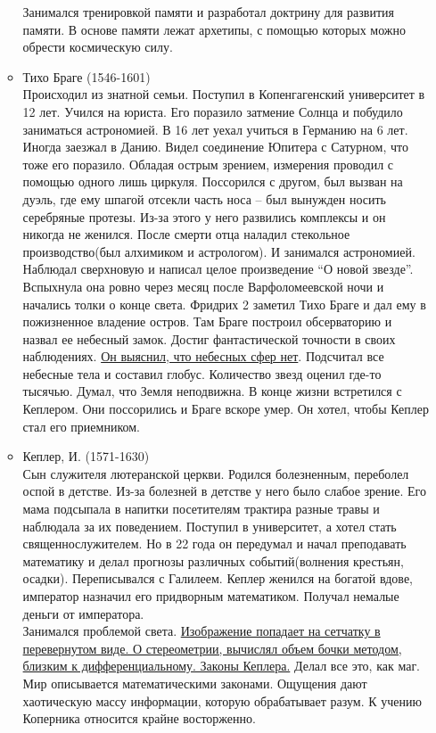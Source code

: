 \documentclass[a4paper,12pt]{report} %
\begin{document}
\begin{itemize}
\begin{itemize}
Занимался тренировкой памяти и разработал доктрину для развития
памяти. В основе памяти лежат архетипы, с помощью которых можно
обрести космическую силу.
\item Тихо Браге (1546-1601)\\
Происходил из знатной семьи. Поступил в Копенгагенский университет в
12 лет. Учился на юриста. Его поразило затмение Солнца и побудило
заниматься астрономией. В 16 лет уехал учиться в Германию на 6
лет. Иногда заезжал в Данию. Видел соединение Юпитера с Сатурном, что
тоже его поразило. Обладая острым зрением, измерения проводил с
помощью одного лишь циркуля. Поссорился с другом, был вызван на дуэль,
где ему шпагой отсекли часть носа -- был вынужден носить серебряные
протезы. Из-за этого у него развились комплексы и он никогда не
женился. После смерти отца наладил стекольное производство(был
алхимиком и астрологом). И занимался астрономией. Наблюдал сверхновую
и написал целое произведение ``О новой звезде''. Вспыхнула она ровно
через месяц после Варфоломеевской ночи и начались толки о конце
света. Фридрих 2 заметил Тихо Браге и дал ему в пожизненное владение
остров. Там Браге построил обсерваторию и назвал ее небесный
замок. Достиг фантастической точности в своих наблюдениях. \underline{Он выяснил,
что небесных сфер нет}. Подсчитал все небесные тела и составил
глобус. Количество звезд оценил где-то тысячью. Думал, что Земля
неподвижна. В конце жизни встретился с Кеплером. Они поссорились и
Браге вскоре умер. Он хотел, чтобы Кеплер стал его приемником.
\item Кеплер, И. (1571-1630)\\
Сын служителя лютеранской церкви. Родился болезненным, переболел оспой
в детстве. Из-за болезней в детстве у него было слабое зрение. Его
мама подсыпала в напитки посетителям трактира разные травы и наблюдала
за их поведением. Поступил в университет, а хотел стать
священнослужителем. Но в 22 года он передумал и начал преподавать
математику и делал прогнозы различных событий(волнения крестьян,
осадки). Переписывался с Галилеем. Кеплер женился на богатой вдове,
император назначил его придворным математиком. Получал немалые деньги
от императора.\\
Занимался проблемой света. \underline{Изображение попадает на сетчатку в
перевернутом виде. О стереометрии, вычислял объем бочки методом,
близким к дифференциальному. Законы Кеплера.} Делал все это, как
маг. Мир описывается математическими законами. Ощущения дают
хаотическую массу информации, которую обрабатывает разум. К учению
Коперника относится крайне восторженно.

\end{itemize}
\end{itemize}
\end{document}
